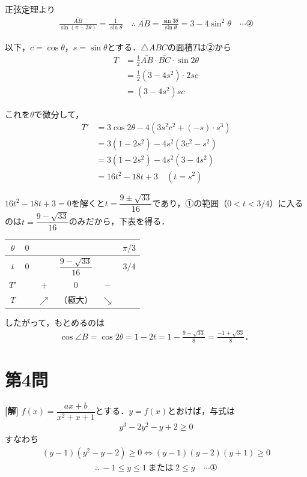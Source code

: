 \documentclass[../main.tex]{subfiles}
\begin{document}
正弦定理より
\begin{align*}
  \frac{\overline{AB}}{\sin(\pi-3\theta)}=\frac{1}{\sin\theta}
  \quad\therefore\ \overline{AB}=\frac{\sin3\theta}{\sin\theta}=3-4\sin^2\theta\quad\cdots②
\end{align*}

以下，$c=\cos\theta$，$s=\sin\theta$とする．$\triangle ABC$の面積$T$は②から
\begin{align*}
  T&=\frac12\overline{AB}\cdot\overline{BC}\cdot\sin2\theta\\
  &=\frac12(3-4s^2)\cdot2sc\\
  &=(3-4s^2)sc
\end{align*}

これを$\theta$で微分して，
\begin{align*}
  T'&=3\cos2\theta-4(3s^2c^2+(-s)\cdot s^3)\\
  &=3(1-2s^2)-4s^2(3c^2-s^2)\\
  &=3(1-2s^2)-4s^2(3-4s^2)\\
  &=16t^2-18t+3\quad(t=s^2)
\end{align*}

$16t^2-18t+3=0$を解くと$t=\dfrac{9\pm\sqrt{33}}{16}$であり，①の範囲（$0<t<3/4$）に入るのは$t=\dfrac{9-\sqrt{33}}{16}$のみだから，下表を得る．

\begin{center}
  \begin{tabular}{c|ccccc}
    $\theta$ & $0$ & & & & $\pi/3$ \\
    \hline
    $t$ & $0$ & & $\dfrac{9-\sqrt{33}}{16}$ & & $3/4$ \\
    \hline
    $T'$ & & $+$ & $0$ & $-$ & \\
    \hline
    $T$ & & $\nearrow$ & （極大） & $\searrow$ & \\
  \end{tabular}
\end{center}

したがって，もとめるのは
\begin{align*}
  \cos\angle B=\cos2\theta=1-2t=1-\frac{9-\sqrt{33}}{8}=\frac{-1+\sqrt{33}}{8}．
\end{align*}

\newpage

\section*{第4問}

{\bf [解]}
$f(x)=\dfrac{ax+b}{x^2+x+1}$とする．$y=f(x)$とおけば，与式は
\begin{align*}
  y^3-2y^2-y+2\ge0
\end{align*}
すなわち
\begin{align*}
  (y-1)(y^2-y-2)\ge0 \iff (y-1)(y-2)(y+1)\ge0
\end{align*}
\begin{align*}
  \therefore\ -1\le y\le1\ \text{または}\ 2\le y\quad\cdots①
\end{align*}
\end{document}
